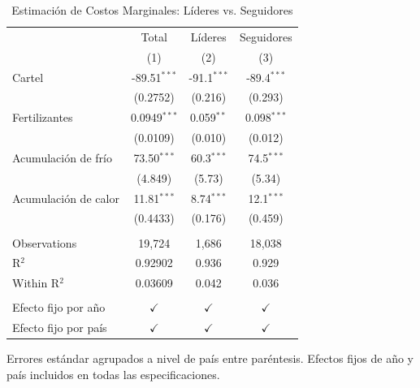 \begin{table}[H]
   \caption{Estimación de Costos Marginales: Líderes vs. Seguidores}
   \bigskip
   \centering
   \begin{tabular}{lccc}
      \hline 
      \hline 
      \toprule
                            & Total & Líderes       & Seguidores \\   
                            & (1) & (2)           & (3)\\  
      \hline
      \midrule 
      Cartel             & -89.51$^{***}$ & -91.1$^{***}$ & -89.4$^{***}$\\   
                            & (0.2752) & (0.216)       & (0.293)\\   
      Fertilizantes  & 0.0949$^{***}$ & 0.059$^{**}$  & 0.098$^{***}$\\   
                            & (0.0109) & (0.010)       & (0.012)\\   
      Acumulación de frío      & 73.50$^{***}$ & 60.3$^{***}$  & 74.5$^{***}$\\   
                            & (4.849) & (5.73)        & (5.34)\\   
      Acumulación de calor      & 11.81$^{***}$ & 8.74$^{***}$  & 12.1$^{***}$\\   
                            & (0.4433) & (0.176)       & (0.459)\\   
       \\
      \hline
      Observations          & 19,724 & 1,686         & 18,038\\  
      R$^2$                 & 0.92902 & 0.936         & 0.929\\  
      Within R$^2$          & 0.03609 & 0.042         & 0.036\\  
       \\
      \hline
      Efecto fijo por año    & $\checkmark$ & $\checkmark$  & $\checkmark$\\   
      Efecto fijo por país & $\checkmark$ & $\checkmark$  & $\checkmark$\\   
      \bottomrule
   \end{tabular}
   
   \par \raggedright 
   Errores estándar agrupados a nivel de país entre paréntesis. Efectos fijos de año y país incluidos en todas las especificaciones.
\end{table}


